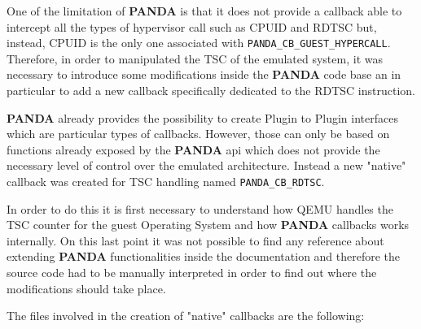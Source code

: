 One of the limitation of \textbf{PANDA} is that it does not provide a callback able to intercept all the types of hypervisor call such as CPUID and RDTSC but, instead, CPUID is the only one associated with \lstinline{PANDA_CB_GUEST_HYPERCALL}. Therefore, in order to manipulated the TSC of the emulated system, it was necessary to introduce some modifications inside the \textbf{PANDA} code base an in particular to add a new callback specifically dedicated to the RDTSC instruction. 

\textbf{PANDA} already provides the possibility to create Plugin to Plugin interfaces which are particular types of callbacks. However, those can only be based on functions already exposed by the \textbf{PANDA} api which does not provide the necessary level of control over the emulated architecture. Instead a new "native" callback was created for TSC handling named \lstinline{PANDA_CB_RDTSC}. 

In order to do this it is first necessary to understand how QEMU handles the TSC counter for the guest Operating System and how \textbf{PANDA} callbacks works internally. On this last point it was not possible to find any reference about extending \textbf{PANDA} functionalities inside the documentation and therefore the source code had to be manually interpreted in order to find out where the modifications should take place.

The files involved in the creation of "native" callbacks are the following: 


